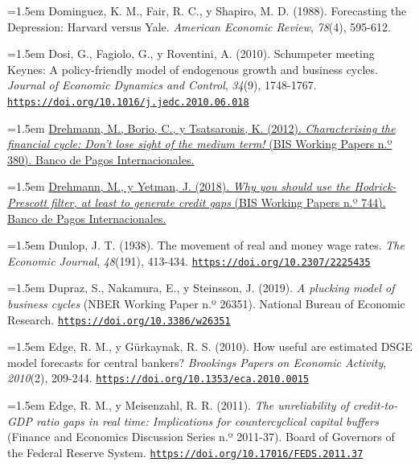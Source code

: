 \documentclass[10pt,a4paper]{article}
\begin{document}
\noindent\hangindent=1.5em Dominguez, K. M., Fair, R. C., y Shapiro, M. D. (1988). Forecasting the Depression: Harvard versus Yale. \textit{American Economic Review}, \textit{78}(4), 595-612.

{\sloppy\noindent\hangindent=1.5em Dosi, G., Fagiolo, G., y Roventini, A. (2010). Schumpeter meeting Keynes: A policy-friendly model of endogenous growth and business cycles. \textit{Journal of Economic Dynamics and Control}, \textit{34}(9), 1748-1767. \href{https://doi.org/10.1016/j.jedc.2010.06.018}{\nolinkurl{https://doi.org/10.1016/j.jedc.2010.06.018}}\par}

\noindent\hangindent=1.5em \href{https://www.bis.org/publ/work380.htm}{Drehmann, M., Borio, C., y Tsatsaronis, K. (2012). \textit{Characterising the financial cycle: Don't lose sight of the medium term!} (BIS Working Papers n.º 380). Banco de Pagos Internacionales.}

\noindent\hangindent=1.5em \href{https://www.bis.org/publ/work744.htm}{Drehmann, M., y Yetman, J. (2018). \textit{Why you should use the Hodrick-Prescott filter, at least to generate credit gaps} (BIS Working Papers n.º 744). Banco de Pagos Internacionales.}

\noindent\hangindent=1.5em Dunlop, J. T. (1938). The movement of real and money wage rates. \textit{The Economic Journal}, \textit{48}(191), 413-434. \href{https://doi.org/10.2307/2225435}{\nolinkurl{https://doi.org/10.2307/2225435}}

\noindent\hangindent=1.5em Dupraz, S., Nakamura, E., y Steinsson, J. (2019). \textit{A plucking model of business cycles} (NBER Working Paper n.º 26351). National Bureau of Economic Research. \href{https://doi.org/10.3386/w26351}{\nolinkurl{https://doi.org/10.3386/w26351}}

\noindent\hangindent=1.5em Edge, R. M., y Gürkaynak, R. S. (2010). How useful are estimated DSGE model forecasts for central bankers? \textit{Brookings Papers on Economic Activity}, \textit{2010}(2), 209-244. \href{https://doi.org/10.1353/eca.2010.0015}{\nolinkurl{https://doi.org/10.1353/eca.2010.0015}}

\noindent\hangindent=1.5em Edge, R. M., y Meisenzahl, R. R. (2011). \textit{The unreliability of credit-to-GDP ratio gaps in real time: Implications for countercyclical capital buffers} (Finance and Economics Discussion Series n.º 2011-37). Board of Governors of the Federal Reserve System. \href{https://doi.org/10.17016/FEDS.2011.37}{\nolinkurl{https://doi.org/10.17016/FEDS.2011.37}}
\end{document}
